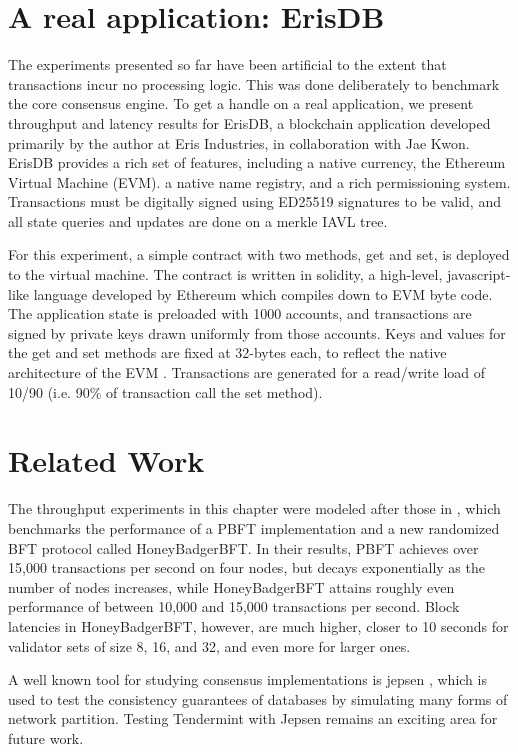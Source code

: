 \ifx
\section{A real application: ErisDB}

The experiments presented so far have been artificial to the extent that transactions incur no processing logic.
This was done deliberately to benchmark the core consensus engine. 
To get a handle on a real application, we present throughput and latency results for ErisDB, 
a blockchain application developed primarily by the author at Eris Industries, in collaboration with Jae Kwon.
ErisDB provides a rich set of features, including a native currency, the Ethereum Virtual Machine (EVM).
a native name registry, and a rich permissioning system.
Transactions must be digitally signed using ED25519 signatures to be valid, and all state queries and updates are done on a merkle IAVL tree.

For this experiment, a simple contract with two methods, get and set, is deployed to the virtual machine.
The contract is written in solidity, a high-level, javascript-like language developed by Ethereum which compiles down to EVM byte code.
The application state is preloaded with 1000 accounts, and transactions are signed by private keys drawn uniformly from those accounts.
Keys and values for the get and set methods are fixed at 32-bytes each, to reflect the native architecture of the EVM \cite{ethereum_yellow_paper}.
Transactions are generated for a read/write load of 10/90 (i.e. 90\% of transaction call the set method).

\fi

\section{Related Work}

The throughput experiments in this chapter were modeled after those in \cite{honeybadger},
which benchmarks the performance of a PBFT implementation 
and a new randomized BFT protocol called HoneyBadgerBFT.
In their results, PBFT achieves over 15,000 transactions per second on four nodes,
but decays exponentially as the number of nodes increases, 
while HoneyBadgerBFT attains roughly even performance
of between 10,000 and 15,000 transactions per second.
Block latencies in HoneyBadgerBFT, however, are much higher, 
closer to 10 seconds for validator sets of size 8, 16, and 32, and even more for larger ones.

A well known tool for studying consensus implementations is jepsen \cite{jepsen},
which is used to test the consistency guarantees of databases by simulating 
many forms of network partition. 
Testing Tendermint with Jepsen remains an exciting area for future work.

